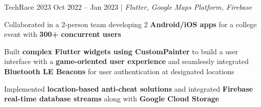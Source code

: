 \resumeSubheadings
{TechRace 2023  }
{Oct 2022 -- Jan 2023}
{}{}{| \textit{Flutter, Google Maps Platform, Firebase}}
\resumeItemListStart
\item Collaborated in a 2-person team developing 2 \textbf{Android/iOS apps} for a college event with \textbf{300+ concurrent users}
\item Built \textbf{complex Flutter widgets using CustomPainter} to build a user interface with a \textbf{game-oriented user experience} and seamlessly integrated \textbf{Bluetooth LE Beacons} for
 user authentication at designated locations
\item Implemented \textbf{location-based anti-cheat solutions} and integrated \textbf{Firebase real-time database streams} along with
 \textbf{Google Cloud Storage}
\resumeItemListEnd